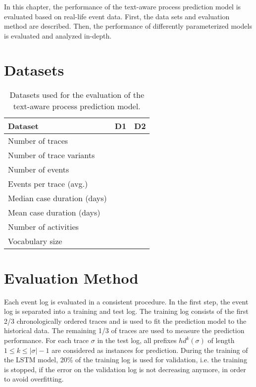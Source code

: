 In this chapter, the performance of the text-aware process prediction model is evaluated based on real-life event data.
First, the data sets and evaluation method are described. Then, the performance of differently parameterized models is evaluated and analyzed in-depth.


\section{Datasets}

\begin{table}[!htbp]
	\begin{tabularx}{\textwidth}{l l l }
		\toprule
		\textbf{Dataset} & \textbf{D1} & \textbf{D2}  \\
		\midrule
		Number of traces & & \\
		Number of trace variants & & \\
		Number of events & & \\
		Events per trace (avg.) & & \\
		Median case duration (days) & & \\
		Mean case duration (days)& & \\
		Number of activities & & \\
		Vocabulary size & & \\
		\bottomrule
	\end{tabularx}
	\caption[Evaluated datasets]{Datasets used for the evaluation of the text-aware process prediction model.}
	\label{tab:packages}
\end{table}

\section{Evaluation Method}

Each event log is evaluated in a consistent procedure.
In the first step, the event log is separated into a training and test log. 
The training log consists of the first 2/3 chronologically ordered traces and is used to fit the prediction model to the historical data.
The remaining 1/3 of traces are used to measure the prediction performance.
For each trace $\sigma$ in the test log, all prefixes $hd^k(\sigma)$ of length $1 \leq k \leq |\sigma| - 1$ are considered as instances for prediction.
During the training of the LSTM model, 20\% of the training log is used for validation, i.e. the training is stopped, if the error on the validation log is not decreasing anymore, in order to avoid overfitting.

